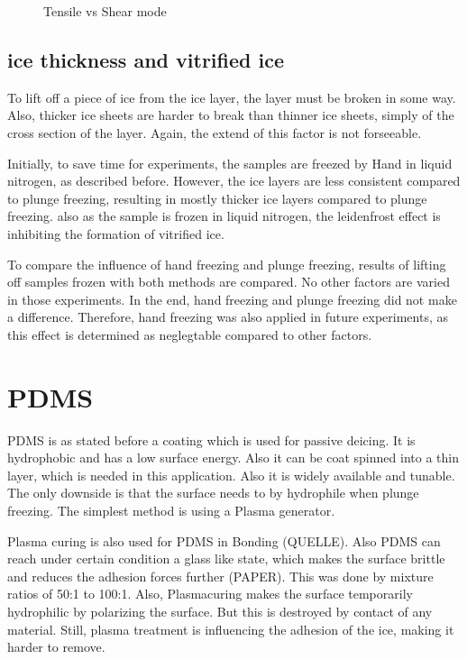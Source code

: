 \begin{figure}[hbt!]
	\centering
	
	\caption{Tensile vs Shear mode}
	\label{fig:tensilevsshear}
\end{figure}

\subsection{ice thickness and vitrified ice}

To lift off a piece of ice from the ice layer, the layer must be broken in some way. Also, thicker ice sheets are harder to break than thinner ice sheets, simply of the cross section of the layer. Again, the extend of this factor is not forseeable. 

Initially, to save time for experiments, the samples are freezed by Hand in liquid nitrogen, as described before. However, the ice layers are less consistent compared to plunge freezing, resulting in mostly thicker ice layers compared to plunge freezing. also as the sample is frozen in liquid nitrogen, the leidenfrost effect is inhibiting the formation of vitrified ice. 

To compare the influence of hand freezing and plunge freezing, results of lifting off samples frozen with both methods are compared. No other factors are varied in those experiments. In the end, hand freezing and plunge freezing did not make a difference. Therefore, hand freezing was also applied in future experiments, as this effect is determined as neglegtable compared to other factors.

\section{PDMS}

PDMS is as stated before a coating which is used for passive deicing. It is hydrophobic and has a low surface energy. Also it can be coat spinned into a thin layer, which is needed in this application. Also it is widely available and tunable. The only downside is that the surface needs to by hydrophile when plunge freezing. The simplest method is using a Plasma generator.

Plasma curing is also used for PDMS in Bonding (QUELLE). Also PDMS can reach under certain condition a glass like state, which makes the surface brittle and reduces the adhesion forces further (PAPER). This was done by mixture ratios of 50:1 to 100:1. Also, Plasmacuring makes the surface temporarily hydrophilic by polarizing the surface. But this is destroyed by contact of any material. Still, plasma treatment is influencing the adhesion of the ice, making it harder to remove.


